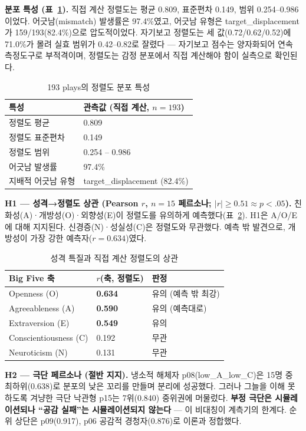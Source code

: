 \documentclass[11pt, a4paper]{article}
\begin{document}
\textbf{분포 특성 (표~\ref{tab:dist}).} 직접 계산 정렬도는 평균 0.809, 표준편차 0.149, 범위 0.254--0.986이었다. 어긋남(mismatch) 발생률은 97.4\%였고, 어긋남 유형은 target\_displacement가 159/193(82.4\%)으로 압도적이었다. 자기보고 정렬도는 세 값(0.72/0.62/0.52)에 71.0\%가 몰려 실효 범위가 0.42--0.82로 잘렸다 --- 자기보고 점수는 양자화되어 연속 측정도구로 부적격이며, 정렬도는 감정 분포에서 직접 계산해야 함이 실측으로 확인된다.

\begin{table}[H]
\centering
\caption{193 plays의 정렬도 분포 특성}
\label{tab:dist}
\begin{tabular}{l l}
\toprule
\textbf{특성} & \textbf{관측값 (직접 계산, $n=193$)} \\
\midrule
정렬도 평균 & 0.809 \\
정렬도 표준편차 & 0.149 \\
정렬도 범위 & 0.254 -- 0.986 \\
어긋남 발생률 & 97.4\% \\
지배적 어긋남 유형 & target\_displacement (82.4\%) \\
\bottomrule
\end{tabular}
\end{table}

\textbf{H1 --- 성격→정렬도 상관 (Pearson $r$, $n=15$ 페르소나; $|r|\geq0.51 \approx p<.05$).} 친화성(A)·개방성(O)·외향성(E)이 정렬도를 유의하게 예측했다(표~\ref{tab:corr}). H1은 A/O/E에 대해 지지된다. 신경증(N)·성실성(C)은 정렬도와 무관했다. 예측 밖 발견으로, 개방성이 가장 강한 예측자($r=0.634$)였다.

\begin{table}[H]
\centering
\caption{성격 특질과 직접 계산 정렬도의 상관}
\label{tab:corr}
\begin{tabular}{l l l}
\toprule
\textbf{Big Five 축} & \textbf{$r$(축, 정렬도)} & \textbf{판정} \\
\midrule
Openness (O) & \textbf{0.634} & 유의 (예측 밖 최강) \\
Agreeableness (A) & \textbf{0.590} & 유의 (예측대로) \\
Extraversion (E) & \textbf{0.549} & 유의 \\
Conscientiousness (C) & 0.192 & 무관 \\
Neuroticism (N) & 0.131 & 무관 \\
\bottomrule
\end{tabular}
\end{table}

\textbf{H2 --- 극단 페르소나 (절반 지지).} 냉소적 해체자 p08(low\_A\_low\_C)은 15명 중 최하위(0.638)로 분포의 낮은 꼬리를 만들며 분리에 성공했다. 그러나 그늘을 이해 못 하도록 겨냥한 극단 낙관형 p15는 7위(0.840) 중위권에 머물렀다. \textbf{부정 극단은 시뮬레이션되나 ``공감 실패''는 시뮬레이션되지 않는다} --- 이 비대칭이 계측기의 한계다. 순위 상단은 p09(0.917), p06 공감적 경청자(0.876)로 이론과 정합했다.
\end{document}
